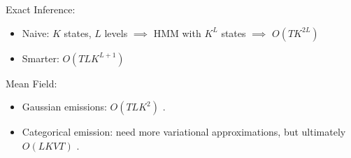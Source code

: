 \begin{frame}

Exact Inference: \\
\begin{itemize}
\item Naive: $K$ states, $L$ levels $\implies$ HMM with $K^L$ states $\implies$  $O(TK^{2L})$ 
    \item Smarter: $O(TLK^{L+1})$
\end{itemize}
\air
\pause 
Mean Field: \\
\begin{itemize}
    \item Gaussian emissions: $O(TLK^2)$ \citep{fhmm1996}.
    \item Categorical emission: need more variational approximations, but ultimately $O(LKVT)$ \citep{nepal2013}.
\end{itemize}
\end{frame}







